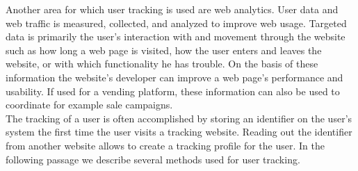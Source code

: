 \documentclass[article,colorback,accentcolor=tud9c,type=bsc]{tudthesis}
\begin{document}
	Another area for which user tracking is used are web analytics. User data and web traffic is measured, collected, and analyzed to improve web usage. Targeted data is primarily the user's interaction with and movement through the website such as how long a web page is visited, how the user enters and leaves the website, or with which functionality he has trouble. On the basis of these information the website's developer can improve a web page's performance and usability. If used for a vending platform, these information can also be used to coordinate for example sale campaigns. \\
	
	The tracking of a user is often accomplished by storing an identifier on the user's system the first time the user visits a tracking website. Reading out the identifier from another website allows to create a tracking profile for the user. In the following passage we describe several methods used for user tracking. \\
	
\end{document}
